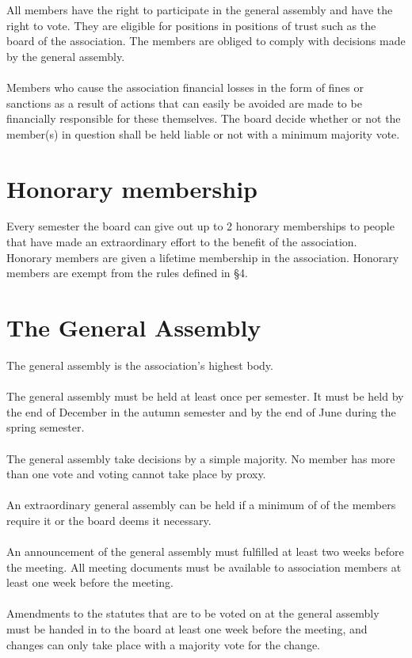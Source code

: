 \documentclass[12pt,a4paper,norsk]{article}
\begin{document}
All members have the right to participate in the general assembly and have the right to vote. They are eligible for positions in positions of trust such as the board of the association. The members are obliged to comply with decisions made by the general assembly.
\\
\\
Members who cause the association financial losses in the form of fines or sanctions as a result of actions that can easily be avoided are made to be financially responsible for these themselves. The board decide whether or not the member(s) in question shall be held liable or not with a minimum  majority vote.


\section{Honorary membership}

Every semester the board can give out up to 2 honorary memberships to people that have made an extraordinary effort to the benefit of the association. Honorary members are given a lifetime membership in the association. Honorary members are exempt from the rules defined in §4.



\section{The General Assembly}

The general assembly is the association's highest body.
\\
\\
The general assembly must be held at least once per semester. It must be held by the end of December in the autumn semester and by the end of June during the spring semester.
\\
\\
The general assembly take decisions by a simple majority. No member has more than one vote and voting cannot take place by proxy.
\\
\\
An extraordinary general assembly can be held if a minimum of  of the members require it or the board deems it necessary.
\\
\\
An announcement of the general assembly must fulfilled at least two weeks before the meeting. All meeting documents must be available to association members at least one week before the meeting.
\\
\\
Amendments to the statutes that are to be voted on at the general assembly must be handed in to the board at least one week before the meeting, and changes can only take place with a  majority vote for the change.
\end{document}

